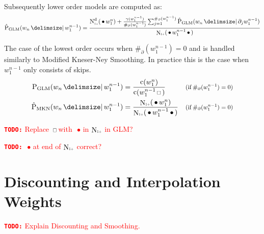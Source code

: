 \documentclass[m,bachelor,binding,palatino]{WeSTthesis}
\newcommand*{\Scale}[2][4]{\scalebox{#1}{$#2$}}%
\newcommand{\Condition}[1]{\Scale[0.85]{(\text{if} \: #1)}}
\DeclareMathOperator{\Count}{c}
\DeclareMathOperator{\ContCount}{N}
\newcommand{\ContCountIp}  {\ContCount_{\Scale[0.5]{1+}}}
\newcommand{\Skp}{\ensuremath{\,\Scale[0.7]{\square}\,}}
\newcommand{\WSkp}{\ensuremath{\,\bullet\,}}
\newcommand{\todo}[1]{\textcolor{red}{{\footnotesize\textbf{\texttt{TODO:}}} #1}}
\begin{document}
Subsequently lower order models are computed as:
\begin{equation}
  \label{eq:glm-low}
  \ProbGLM*{w_n}{w_1^{n-1}} =
    \frac{\DiscountedCount*(\WSkp w_1^n) + \frac{\gamma(w_1^{n-1})}{\#_\partial(w_1^{n-1})}
                                     \sum_{j=1}^{\#_\partial(w_1^{n-1})} \ProbGLM*{w_n}{\partial_j w_1^{n-1}}}
         {\ContCountIp(\WSkp w_1^{n-1} \WSkp)}
\end{equation}

The case of the lowest order occurs when $\#_\partial(w_1^{n-1}) = 0$ and is
handled similarly to Modified Kneser-Ney Smoothing.
In practice this is the case when $w_1^{n-1}$ only consists of skips.
\begin{subequations}
  \label{eq:glm-lowest}
  \begin{align}
    \ProbGLM {w_n}{w_1^{n-1}} &= \frac{\Count(w_1^n)}{\Count(w_1^{n-1} \Skp)}
      & \Condition{\#_\partial(w_1^{n-1}) = 0} \\
    \ProbMKN*{w_n}{w_1^{n-1}} &= \frac{\ContCountIp(\WSkp w_1^n)}{\ContCountIp(\WSkp w_1^{n-1} \WSkp)}
      & \Condition{\#_\partial(w_1^{n-1}) = 0}
  \end{align}
\end{subequations}

\todo{Replace \Skp with \WSkp in $\ContCountIp$ in GLM?}

\todo{\WSkp at end of $\ContCountIp$ correct?}

\section{Discounting and Interpolation Weights}
\label{sec:discounts-interpolation-weights}

\todo{Explain Discounting and Smoothing.}
\end{document}
